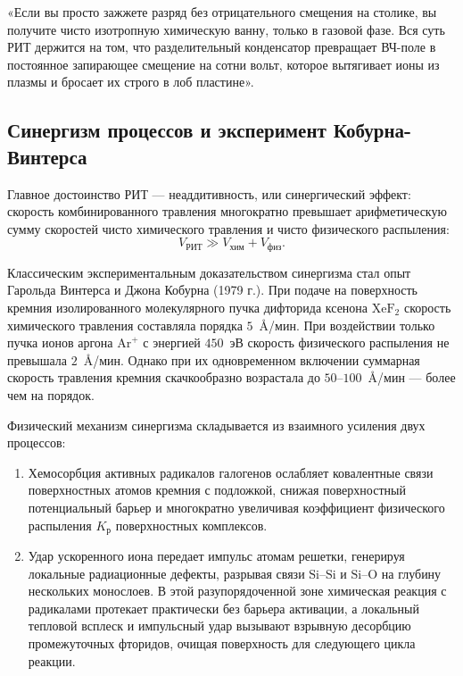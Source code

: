 \documentclass[12pt,a4paper]{article}
\theoremstyle{plain}
\theoremstyle{definition}
\theoremstyle{remark}
\numberwithin{equation}{section}
\begin{document}
«Если вы просто зажжете разряд без отрицательного смещения на столике, вы получите чисто изотропную химическую ванну, только в газовой фазе. Вся суть РИТ держится на том, что разделительный конденсатор превращает ВЧ-поле в постоянное запирающее смещение на сотни вольт, которое вытягивает ионы из плазмы и бросает их строго в лоб пластине».

\subsection{Синергизм процессов и эксперимент Кобурна-Винтерса}

Главное достоинство РИТ — неаддитивность, или синергический эффект: скорость комбинированного травления многократно превышает арифметическую сумму скоростей чисто химического травления и чисто физического распыления:
\begin{equation*}
  V_\text{РИТ} \gg V_\text{хим} + V_\text{физ}.
\end{equation*}

Классическим экспериментальным доказательством синергизма стал опыт Гарольда Винтерса и Джона Кобурна (1979 г.). При подаче на поверхность кремния изолированного молекулярного пучка дифторида ксенона $\mathrm{XeF}_2$ скорость химического травления составляла порядка $5$~\AA/мин. При воздействии только пучка ионов аргона $\mathrm{Ar}^+$ с энергией $450$~эВ скорость физического распыления не превышала $2$~\AA/мин. Однако при их одновременном включении суммарная скорость травления кремния скачкообразно возрастала до $50\text{--}100$~\AA/мин — более чем на порядок.

Физический механизм синергизма складывается из взаимного усиления двух процессов:
\begin{enumerate}
  \item Хемосорбция активных радикалов галогенов ослабляет ковалентные связи поверхностных атомов кремния с подложкой, снижая поверхностный потенциальный барьер и многократно увеличивая коэффициент физического распыления $K_\text{р}$ поверхностных комплексов.
  \item Удар ускоренного иона передает импульс атомам решетки, генерируя локальные радиационные дефекты, разрывая связи $\mathrm{Si}\text{--}\mathrm{Si}$ и $\mathrm{Si}\text{--}\mathrm{O}$ на глубину нескольких монослоев. В этой разупорядоченной зоне химическая реакция с радикалами протекает практически без барьера активации, а локальный тепловой всплеск и импульсный удар вызывают взрывную десорбцию промежуточных фторидов, очищая поверхность для следующего цикла реакции.
\end{enumerate}
\end{document}
